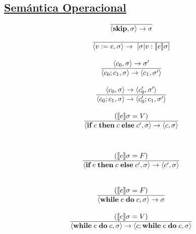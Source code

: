   \subsection*{\underline{Semántica Operacional}}
    \begin{multicols}{2}
      \[\begin{array}{cll}
        \noindent
        \overline{\lang{\skipp, \sigma} \rightarrow \sigma} \\ \\
        
        \overline{\lang{v := e, \sigma} \rightarrow [\sigma | v : \semsAGU{e}]} \\ \\
        
        \lang{c_0, \sigma} \rightarrow \sigma' \\
        \overline{\lang{c_0;c_1, \sigma} \rightarrow \lang{c_1, \sigma'}} \\ \\
        \lang{c_0, \sigma} \rightarrow \lang{c'_0, \sigma'} \\
        \overline{\lang{c_0;c_1, \sigma} \rightarrow \lang{c'_0; c_1, \sigma'}} \\ \\
        
        (\semsAGU{e} = V) \\
        \overline{\lang{\ifthenelse{e}{c}{c'}, \sigma} \rightarrow \lang{c, \sigma}} \\ \\
      \end{array}\]
      \[\begin{array}{cll}
        \noindent
        \\
        (\semsAGU{e} = F) \\
        \overline{\lang{\ifthenelse{e}{c}{c'}, \sigma} \rightarrow \lang{c', \sigma}} \\ \\ \\

        (\semsAGU{e} = F) \\
        \overline{\lang{\while{e}{c}, \sigma} \rightarrow \sigma} \\ \\
        (\semsAGU{e} = V) \\
        \overline{\lang{\while{e}{c}, \sigma} \rightarrow \lang{c; \while{e}{c}, \sigma}} \\ \\ \\


\end{array}\]
\end{multicols}

